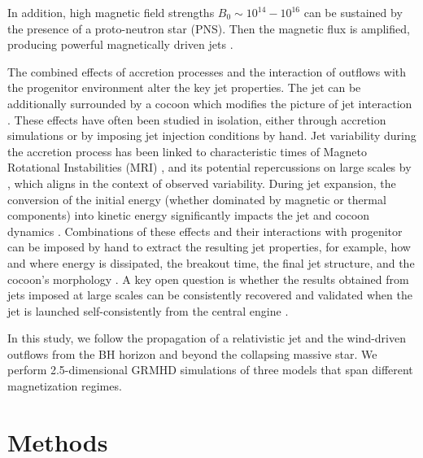 \documentclass{ptapap}
\begin{document}
In addition, high magnetic field strengths $B_0\sim 10^{14}-10^{16}$ can be sustained by the presence of a proto-neutron star (PNS). Then the magnetic flux is amplified, producing powerful magnetically driven jets \citep{Obergaulinger2006axisimetricMagneto,Obergaulinger2006A-2,Burrows_2007,Moesta2014,magnetorotational1,Shibata2024spinEv,FujibayashiShibata2025,Shibata2025arXiv,Urrutia2025Collapsar}.

The combined effects of accretion processes and the interaction of outflows with the progenitor environment alter the key jet properties. The jet can be additionally surrounded by a cocoon which modifies the picture of jet interaction \citep[e.g.,][]{decolle18b,Izzo2019Nature,Hamidani2023}. These effects have often been studied in isolation, either through accretion simulations or by imposing jet injection conditions by hand. Jet variability during the accretion process has been linked to characteristic times of Magneto Rotational Instabilities (MRI)  \citep[e.g.,][]{janiuk_variability2021}, and its potential repercussions on large scales by \citet{lopezcamara2016,harrison18,Becerra2025}, which aligns in the context of observed variability. During jet expansion, the conversion of the initial energy (whether dominated by magnetic or thermal components) into kinetic energy significantly impacts the jet and cocoon dynamics \citep{Tchekhovskoy2009,Matsumoto2019}. Combinations of these effects and their interactions with progenitor can be imposed by hand to extract the resulting jet properties, for example, how and where energy is dissipated, the breakout time, the final jet structure, and the cocoon's morphology \citep[e.g.,][]{urrutia22_3D,urrutia2025,Urrutia2025Collapsar}. A key open question is whether the results obtained from jets imposed at large scales can be consistently recovered and validated when the jet is launched self-consistently from the central engine \citep[e.g.,][]{gottlieb2022b,Gottlieb2023lowspining,GottliebSheGots2024}. 

In this study, we follow the propagation of a relativistic jet and the wind-driven outflows from the BH horizon and beyond the collapsing massive star. We perform 2.5-dimensional GRMHD simulations of three models that span different magnetization regimes.%


\section{Methods}
\end{document}
